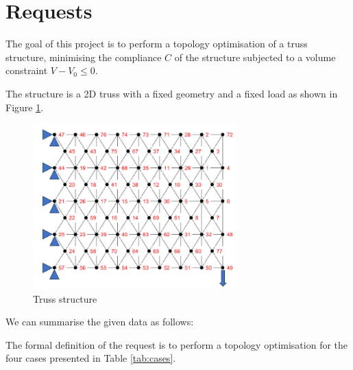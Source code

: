 \section{Requests}
\label{sec:requests}

The goal of this project is to perform a topology optimisation of a truss structure, minimising the compliance $C$ of the structure subjected to a volume constraint $V - V_0 \le 0$.

The structure is a 2D truss with a fixed geometry and a fixed load as shown in Figure \ref{fig:truss}.

\begin{figure}[H]
    \centering
    \includegraphics[width=0.7\textwidth]{img/structure.png}
    \caption{Truss structure}
    \label{fig:truss}
\end{figure}

We can summarise the given data as follows:



The formal definition of the request is to perform a topology optimisation for the four cases presented in Table \ref{tab:cases}.

